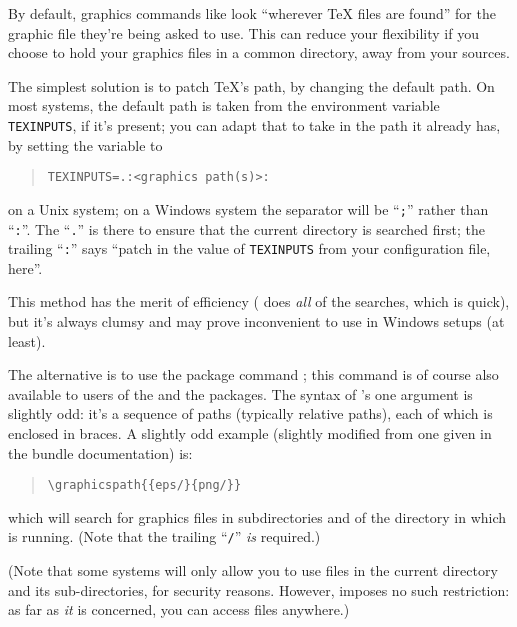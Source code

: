 
By default, graphics commands like  look
``wherever \TeX{} files are found'' for the graphic file they're being
asked to use.  This can reduce your flexibility if you choose to hold
your graphics files in a common directory, away from your \AllTeX{}
sources.

The simplest solution is to patch \TeX{}'s path, by changing the
default path.  On most systems, the default path is taken from the
environment variable \texttt{TEXINPUTS}, if it's present; you can adapt that
to take in the path it already has, by setting the variable to
\begin{quote}
\begin{verbatim}
TEXINPUTS=.:<graphics path(s)>:
\end{verbatim}
\end{quote}
on a Unix system; on a Windows system the separator will be ``\texttt{;}''
rather than ``\texttt{:}''.  The ``\texttt{.}'' is there to ensure
that the current directory is searched first; the trailing
``\texttt{:}'' says ``patch in the value of \texttt{TEXINPUTS} from
your configuration file, here''.

This method has the merit of efficiency (\AllTeX{} does \emph{all} of
the searches, which is quick), but it's always clumsy and may prove
inconvenient to use in Windows setups (at least).

The alternative is to use the  package command
; this command is of course also available to users
of the  and the  packages.  The
syntax of 's one argument is slightly odd: it's a
sequence of paths (typically relative paths), each of which is
enclosed in braces.  A slightly odd example (slightly modified from one
given in the  bundle documentation) is:
\begin{quote}
\begin{verbatim}
\graphicspath{{eps/}{png/}}
\end{verbatim}
\end{quote}
which will search for graphics files in subdirectories  and
 of the directory in which \latex{} is running.  (Note that
the trailing ``\texttt{/}'' \emph{is} required.)

(Note that some \AllTeX{} systems will only allow you to use files in
the current directory and its sub-directories, for security reasons.
However,  imposes no such restriction: as far as
\emph{it} is concerned, you can access files anywhere.)


